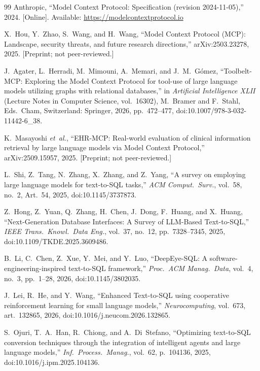 \documentclass[conference,10pt,a4paper]{IEEEtran}
\begin{document}
\begin{thebibliography}{99}
Anthropic, ``Model Context Protocol: Specification (revision 2024-11-05),''
2024. [Online]. Available: \url{https://modelcontextprotocol.io}

X.~Hou, Y.~Zhao, S.~Wang, and H.~Wang, ``Model Context Protocol (MCP):
Landscape, security threats, and future research directions,''
arXiv:2503.23278, 2025. [Preprint; not peer-reviewed.]

J.~Agater, L.~Herradi, M.~Mimouni, A.~Memari, and J.~M.~G\'omez,
``Toolbelt-MCP: Exploring the Model Context Protocol for tool-use of
large language models utilizing graphs with relational databases,'' in
\emph{Artificial Intelligence XLII} (Lecture Notes in Computer Science,
vol.~16302), M.~Bramer and F.~Stahl, Eds.\ Cham, Switzerland: Springer,
2026, pp.~472--477, doi:10.1007/978-3-032-11442-6\_38.

K.~Masayoshi \textit{et~al.}, ``EHR-MCP: Real-world evaluation of clinical
information retrieval by large language models via Model Context
Protocol,'' arXiv:2509.15957, 2025. [Preprint; not peer-reviewed.]

L.~Shi, Z.~Tang, N.~Zhang, X.~Zhang, and Z.~Yang, ``A survey on employing
large language models for text-to-SQL tasks,'' \emph{ACM Comput.\ Surv.},
vol.~58, no.~2, Art.~54, 2025, doi:10.1145/3737873.

Z.~Hong, Z.~Yuan, Q.~Zhang, H.~Chen, J.~Dong, F.~Huang, and X.~Huang,
``Next-Generation Database Interfaces: A Survey of LLM-Based Text-to-SQL,''
\emph{IEEE Trans.\ Knowl.\ Data Eng.}, vol.~37, no.~12, pp.~7328--7345, 2025,
doi:10.1109/TKDE.2025.3609486.

B.~Li, C.~Chen, Z.~Xue, Y.~Mei, and Y.~Luo, ``DeepEye-SQL: A
software-engineering-inspired text-to-SQL framework,''
\emph{Proc.\ ACM Manag.\ Data}, vol.~4, no.~3, pp.~1--28, 2026,
doi:10.1145/3802035.

J.~Lei, R.~He, and Y.~Wang, ``Enhanced Text-to-SQL using cooperative
reinforcement learning for small language models,'' \emph{Neurocomputing},
vol.~673, art.~132865, 2026, doi:10.1016/j.neucom.2026.132865.

S.~Ojuri, T.~A.~Han, R.~Chiong, and A.~Di~Stefano, ``Optimizing
text-to-SQL conversion techniques through the integration of intelligent
agents and large language models,'' \emph{Inf.\ Process.\ Manag.},
vol.~62, p.~104136, 2025, doi:10.1016/j.ipm.2025.104136.


\end{thebibliography}
\end{document}
